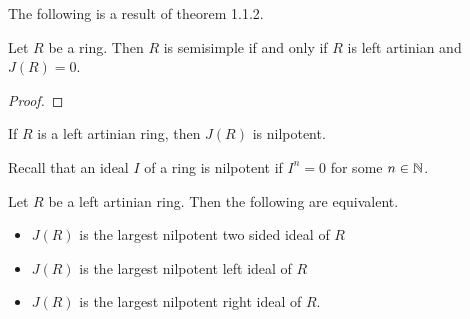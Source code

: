 \documentclass[a4paper]{article}
\begin{document}
The following is a result of theorem 1.1.2. 

\begin{crl}{}{} Let $R$ be a ring. Then $R$ is semisimple if and only if $R$ is left artinian and $J(R)=0$. \tcbline
\begin{proof}
\end{proof}
\end{crl}

\begin{thm}{}{} If $R$ is a left artinian ring, then $J(R)$ is nilpotent. 
\end{thm}

Recall that an ideal $I$ of a ring is nilpotent if $I^n=0$ for some $n\in\mathbb{N}$. 

\begin{crl}{}{} Let $R$ be a left artinian ring. Then the following are equivalent. 
\begin{itemize}
\item $J(R)$ is the largest nilpotent two sided ideal of $R$
\item $J(R)$ is the largest nilpotent left ideal of $R$
\item $J(R)$ is the largest nilpotent right ideal of $R$. 
\end{itemize}
\end{crl}
\end{document}
